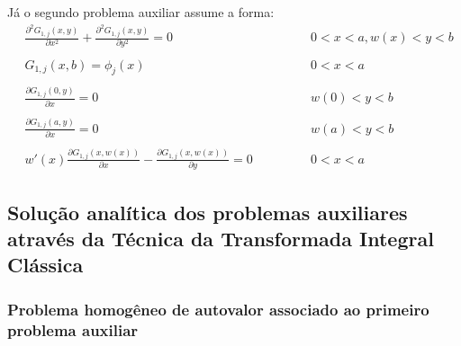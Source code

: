 Já o segundo problema auxiliar assume a forma:
\begin{subequations}
	\begin{alignat}{2}
	& \frac{\partial^2 G_{1,j}(x, y)}{\partial x^2} + \frac{\partial^2 G_{1,j}(x, y)}{\partial y^2} = 0 \quad\quad && 0 < x < a, w(x) < y < b \label{funcao_G_harm_T1_cart} \\ \nonumber \\
	& G_{1,j}(x, b) = \phi_j(x) && 0 < x < a  \label{funcao_G_cc_T1_2_cart} \\ \nonumber \\
	& \frac{\partial G_{1,j}(0, y)}{\partial x} = 0 && w(0) < y < b \label{funcao_G_cc_T1_1a_cart} \\ \nonumber \\
	& \frac{\partial G_{1,j}(a, y)}{\partial x} = 0 && w(a) < y < b \label{funcao_G_cc_T1_1b_cart} \\ \nonumber \\
	& w'(x)\frac{\partial G_{1,j}(x, w(x))}{\partial x} - \frac{\partial G_{1,j}(x, w(x))}{\partial y} = 0 \quad\quad\quad && 0 < x < a \label{funcao_G_cc_grad_T1_cart}
	\end{alignat}
\end{subequations}

\subsection{Solução analítica dos problemas auxiliares através da Técnica da Transformada Integral Clássica}

\subsubsection{Problema homogêneo de autovalor associado ao primeiro problema auxiliar}

